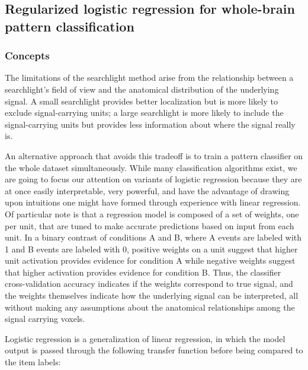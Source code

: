 \subsection{Regularized logistic regression for whole-brain pattern classification}
\subsubsection{Concepts}
The limitations of the searchlight method arise from the relationship between a searchlight's field of view and the anatomical distribution of the underlying signal. A small searchlight provides better localization but is more likely to exclude signal-carrying units; a large searchlight is more likely to include the signal-carrying units but provides less information about where the signal really is. 

An alternative approach that avoids this tradeoff is to train a pattern classifier on the whole dataset simultaneously. While many classification algorithms exist, we are going to focus our attention on variants of logistic regression because they are at once easily interpretable, very powerful, and have the advantage of drawing upon intuitions one might have formed through experience with linear regression. Of particular note is that a regression model is composed of a set of weights, one per unit, that are tuned to make accurate predictions based on input from each unit. In a binary contrast of conditions A and B, where A events are labeled with 1 and B events are labeled with 0, positive weights on a unit suggest that higher unit activation provides evidence for condition A while negative weights suggest that higher activation provides evidence for condition B. Thus, the classifier cross-validation accuracy indicates if the weights correspond to true signal, and the weights themselves indicate how the underlying signal can be interpreted, all without making any assumptions about the anatomical relationships among the signal carrying voxels.

Logistic regression is a generalization of linear regression, in which the model output is passed through the following transfer function before being compared to the item labels:

